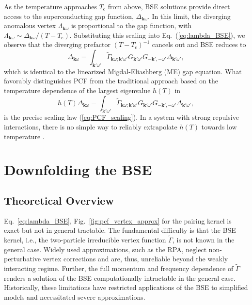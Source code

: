 \documentclass[%
 reprint,
superscriptaddress,
 amsmath,amssymb,
 aps,
prx,
]{revtex4-2}
\newcommand{\bk}{\mathbf{k}}
\newcommand{\Gammapp}{\tilde{\Gamma}}
\begin{document}
As the temperature approaches $T_{\text{c}}$ from above, BSE solutions provide direct access to the superconducting gap function, $\Delta_{\bk\omega}$. In this limit, the diverging anomalous vertex $\Lambda_{\bk\omega}$ is proportional to the gap function, with $\Lambda_{\bk\omega} \sim \Delta_{\bk\omega}/(T - T_{\text{c}})$. Substituting this scaling into Eq.~(\ref{eq:lambda_BSE}), we observe that the diverging prefactor $(T - T_{\text{c}})^{-1}$ cancels out and BSE reduces to 
\begin{equation}  
\label{eq:delta1}
    \Delta_{\bk\omega} =  \int_{\bk'\omega'} \tilde{\Gamma}_{\bk\omega;\bk'\omega'} G_{\bk'\omega'} G_{-\bk',-\omega'} \Delta_{\bk'\omega'},  
\end{equation}  
which is identical to the linearized Migdal-Eliashberg (ME) gap equation. 
What favorably distinguishes PCF from the traditional approach based on the temperature dependence of the largest eigenvalue $h(T)$ in 
\begin{equation}  
   h(T)  \Delta_{\bk\omega} =  \int_{\bk'\omega'} \tilde{\Gamma}_{\bk\omega;\bk'\omega'} G_{\bk'\omega'} G_{-\bk',-\omega'} \Delta_{\bk'\omega'},  
\end{equation} 
is the precise scaling law (\ref{eq:PCF_scaling}). In a system with strong repulsive interactions, there is no simple way to reliably extrapolate $h(T)$ towards low temperature \cite{implicit}. 


\section{Downfolding the BSE}
\label{sec:downfolding}
\subsection{Theoretical Overview}

Eq.~\ref{eq:lambda_BSE}, Fig.~\ref{fig:pcf_vertex_approx} for the pairing kernel is exact but not in general tractable. 
The fundamental difficulty is that the BSE kernel, i.e., the two-particle irreducible vertex function $\Gammapp$, is not known in the general case. Widely used approximations, such as the RPA, neglect non-perturbative vertex corrections and are, thus, unreliable beyond the weakly interacting regime. Further, the full momentum and frequency dependence of $\Gammapp$  renders a solution of the BSE computationally intractable in the general case. Historically, these limitations have restricted applications of the BSE to simplified models and necessitated severe approximations.
\end{document}
